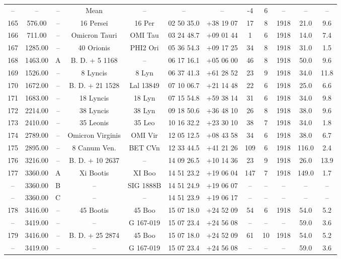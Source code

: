 \begin{table}
\begin{tabular}{cccccccccccc}
-- & -- & -- & Mean & -- & -- & -- & -4 & 6 & -- & -- & -- \\
165 & 576.00 & -- & 16 Persei & 16 Per & 02 50 35.0 & +38 19 07 & 17 & 8 & 1918 & 21.0 & 9.6 \\
166 & 711.00 & -- & Omicron Tauri & OMI Tau & 03 24 48.7 & +09 01 44 & 1 & 6 & 1918 & 14.0 & 7.4 \\
167 & 1285.00 & -- & 40 Orionis & PHI2 Ori & 05 36 54.3 & +09 17 25 & 34 & 8 & 1918 & 31.0 & 1.5 \\
168 & 1463.00 & A & B. D. + 5  1168 & -- & 06 17 16.1 & +05 06 00 & 46 & 8 & 1918 & 50.0 & 9.6 \\
169 & 1526.00 & -- & 8 Lyncis & 8 Lyn & 06 37 41.3 & +61 28 52 & 23 & 9 & 1918 & 34.0 & 11.8 \\
170 & 1672.00 & -- & B. D. + 21  1528 & Lal 13849 & 07 10 06.7 & +21 14 48 & 22 & 6 & 1918 & 25.0 & 6.6 \\
171 & 1683.00 & -- & 18 Lyncis & 18 Lyn & 07 15 54.8 & +59 38 14 & 31 & 6 & 1918 & 34.0 & 9.8 \\
172 & 2214.00 & -- & 38 Lyncis & 38 Lyn & 09 18 50.6 & +36 48 10 & 26 & 8 & 1918 & 38.0 & 9.6 \\
173 & 2410.00 & -- & 35 Leonis & 35 Leo & 10 16 32.2 & +23 30 10 & 38 & 7 & 1918 & 34.0 & 1.8 \\
174 & 2789.00 & -- & Omicron Virginis & OMI Vir & 12 05 12.5 & +08 43 58 & 34 & 6 & 1918 & 38.0 & 6.7 \\
175 & 2895.00 & -- & 8 Canum Ven. & BET CVn & 12 33 44.5 & +41 21 26 & 109 & 6 & 1918 & 116.0 & 2.4 \\
176 & 3216.00 & -- & B. D. + 10  2637 & -- & 14 09 26.5 & +10 14 36 & 23 & 9 & 1918 & 26.0 & 13.9 \\
177 & 3360.00 & A & Xi Bootis & XI Boo & 14 51 23.2 & +19 06 04 & 147 & 7 & 1918 & 149.0 & 1.7 \\
-- & 3360.00 & B & -- & SIG 1888B & 14 51 24.9 & +19 06 07 & -- & -- & -- & -- & -- \\
-- & 3360.00 & C & -- & -- & 14 51 23.9 & +19 06 17 & -- & -- & -- & -- & -- \\
178 & 3416.00 & -- & 45 Bootis & 45 Boo & 15 07 18.0 & +24 52 09 & 54 & 6 & 1918 & 54.0 & 5.2 \\
-- & 3419.00 & -- & -- & G 167-019 & 15 07 23.4 & +24 56 08 & -- & -- & -- & 59.0 & 3.6 \\
179 & 3416.00 & -- & B. D. + 25  2874 & 45 Boo & 15 07 18.0 & +24 52 09 & 61 & 10 & 1918 & 54.0 & 5.2 \\
-- & 3419.00 & -- & -- & G 167-019 & 15 07 23.4 & +24 56 08 & -- & -- & -- & 59.0 & 3.6 \\

\end{tabular}
\end{table}

